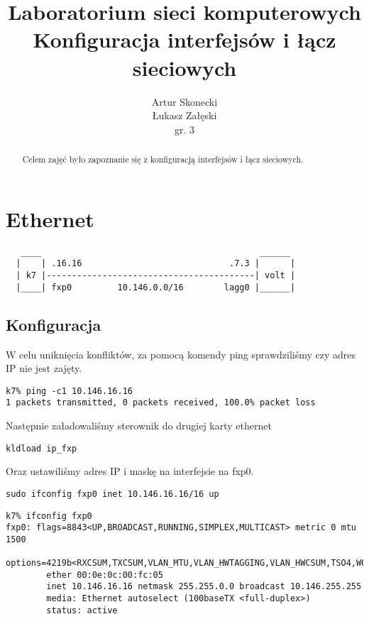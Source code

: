 \documentclass[a4paper,11pt,notitlepage]{article}
\title{\textbf{Laboratorium sieci komputerowych\\Konfiguracja interfejsów i łącz sieciowych}}
\author{Artur Skonecki\\Łukasz Załęski\\gr. 3}
\begin{document}
\maketitle
\begin{abstract}
\noindent
\large
Celem zajęć było zapoznanie się z konfiguracją interfejsów i łącz sieciowych.
\end{abstract}


\section{Ethernet}

\begin{verbatim}
   ____                                           ______
  |    | .16.16                             .7.3 |      |
  | k7 |-----------------------------------------| volt |
  |____| fxp0         10.146.0.0/16        lagg0 |______|
\end{verbatim}

\subsection{Konfiguracja}

W celu uniknięcia konfliktów, za pomocą komendy ping sprawdziliśmy czy adres IP nie jest zajęty.

\begin{verbatim}
k7% ping -c1 10.146.16.16
1 packets transmitted, 0 packets received, 100.0% packet loss
\end{verbatim}

Następnie załadowaliśmy sterownik do drugiej karty ethernet
\begin{verbatim}
kldload ip_fxp
\end{verbatim}
Oraz ustawiliśmy adres IP i maskę na interfejsie na fxp0.
\begin{verbatim}
sudo ifconfig fxp0 inet 10.146.16.16/16 up
\end{verbatim}


\begin{verbatim}
k7% ifconfig fxp0
fxp0: flags=8843<UP,BROADCAST,RUNNING,SIMPLEX,MULTICAST> metric 0 mtu 1500
        options=4219b<RXCSUM,TXCSUM,VLAN_MTU,VLAN_HWTAGGING,VLAN_HWCSUM,TSO4,WOL_MAGIC,VLAN_HWTSO>
        ether 00:0e:0c:00:fc:05
        inet 10.146.16.16 netmask 255.255.0.0 broadcast 10.146.255.255
        media: Ethernet autoselect (100baseTX <full-duplex>)
        status: active
\end{verbatim}
\end{document}
